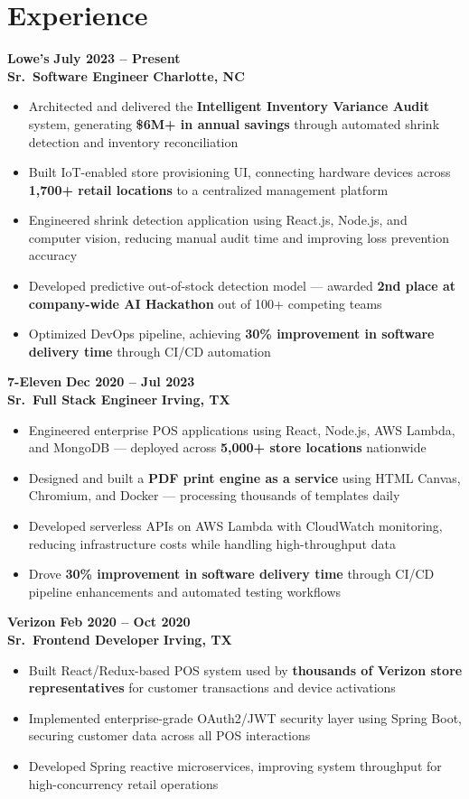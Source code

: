 \documentclass[letterpaper]{article}
\begin{document}
\section*{Experience}

\textbf{Lowe's} \hfill \textbf{July 2023 -- Present}\\
\textbf{Sr.\ Software Engineer} \hfill \textbf{Charlotte, NC}
\begin{itemize}
  \item Architected and delivered the \textbf{Intelligent Inventory Variance Audit} system, generating \textbf{\$6M+ in annual savings} through automated shrink detection and inventory reconciliation
  \item Built IoT-enabled store provisioning UI, connecting hardware devices across \textbf{1,700+ retail locations} to a centralized management platform
  \item Engineered shrink detection application using React.js, Node.js, and computer vision, reducing manual audit time and improving loss prevention accuracy
  \item Developed predictive out-of-stock detection model --- awarded \textbf{2nd place at company-wide AI Hackathon} out of 100+ competing teams
  \item Optimized DevOps pipeline, achieving \textbf{30\% improvement in software delivery time} through CI/CD automation
\end{itemize}

\textbf{7-Eleven} \hfill \textbf{Dec 2020 -- Jul 2023}\\
\textbf{Sr.\ Full Stack Engineer} \hfill \textbf{Irving, TX}
\begin{itemize}
  \item Engineered enterprise POS applications using React, Node.js, AWS Lambda, and MongoDB --- deployed across \textbf{5,000+ store locations} nationwide
  \item Designed and built a \textbf{PDF print engine as a service} using HTML Canvas, Chromium, and Docker --- processing thousands of templates daily
  \item Developed serverless APIs on AWS Lambda with CloudWatch monitoring, reducing infrastructure costs while handling high-throughput data
  \item Drove \textbf{30\% improvement in software delivery time} through CI/CD pipeline enhancements and automated testing workflows
\end{itemize}

\textbf{Verizon} \hfill \textbf{Feb 2020 -- Oct 2020}\\
\textbf{Sr.\ Frontend Developer} \hfill \textbf{Irving, TX}
\begin{itemize}
  \item Built React/Redux-based POS system used by \textbf{thousands of Verizon store representatives} for customer transactions and device activations
  \item Implemented enterprise-grade OAuth2/JWT security layer using Spring Boot, securing customer data across all POS interactions
  \item Developed Spring reactive microservices, improving system throughput for high-concurrency retail operations
\end{itemize}
\end{document}
